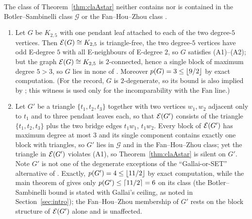 \begin{proposition}\label{prop:claincomp}
The class of Theorem~\ref{thm:claAstar} neither contains nor is contained
in the Botler--Sambinelli class $\mathcal{G}$ \cite{BS21} or the
Fan--Hou--Zhou class \cite{FHZ23}.
\begin{enumerate}[label={\rm(\roman*)},leftmargin=2em]
\item Let $G$ be $K_{2,5}$ with one pendant leaf attached to each of the
two degree-$5$ vertices. Then $\mathcal{E}(G)\cong K_{2,5}$ is triangle-free, the
two degree-$5$ vertices have odd E-degree $5$ with all E-neighbours of
E-degree $2$, so $G$ satisfies (A1)--(A2); but the graph
$\mathcal{E}(G)\cong K_{2,5}$ is $2$-connected, hence a single block of maximum
degree $5>3$, so $G$ lies in none of \cite{Fan05,BS21,FHZ23}. Moreover
$p(G)=3\le\left\lfloor 9/2 \right\rfloor$ by exact computation. (For the record, $G$ is
$2$-degenerate, so its bound is also implied by \cite{ZLH24}; this witness
is used only for the incomparability with the Fan line.)
\item Let $G'$ be a triangle $\{t_1,t_2,t_3\}$ together with two vertices
$w_1,w_2$ adjacent only to $t_1$ and to three pendant leaves each, so that
$\mathcal{E}(G')$ consists of the triangle $\{t_1,t_2,t_3\}$ plus the two bridge
edges $t_1w_1$, $t_1w_2$. Every block of $\mathcal{E}(G')$ has maximum degree at
most $3$ and its single component contains exactly one block with
triangles, so $G'$ lies in $\mathcal{G}$ and in the Fan--Hou--Zhou class;
yet the triangle in $\mathcal{E}(G')$ violates (A1), so Theorem~\ref{thm:claAstar}
is silent on $G'$. Note $G'$ is not one of the degenerate exceptions of
the ``Gallai-or-SET'' alternative of \cite{BS21}. Exactly,
$p(G')=4\le\left\lfloor 11/2 \right\rfloor$ by exact computation, while the main theorem of
\cite{BS21} gives only $p(G')\le\left\lceil 11/2 \right\rceil=6$ on its class (the
Botler--Sambinelli bound is stated with Gallai's ceiling, as noted in
Section~\ref{sec:intro}); the Fan--Hou--Zhou membership of $G'$ rests on
the block structure of $\mathcal{E}(G')$ alone and is unaffected.
\end{enumerate}
\end{proposition}

